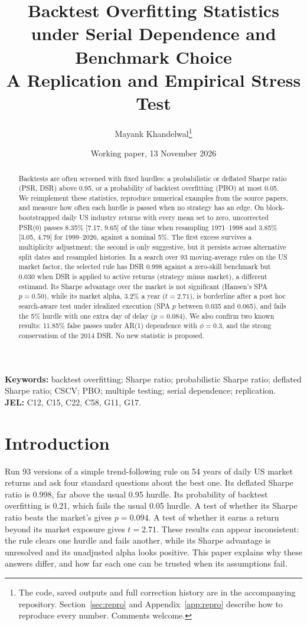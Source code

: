 \documentclass[11pt,a4paper]{article}
\title{\Large\textbf{Backtest Overfitting Statistics under Serial Dependence and Benchmark Choice}\\[4pt] \large A Replication and Empirical Stress Test}
\author{Mayank Khandelwal\thanks{The code, saved outputs and full correction history are in the accompanying repository. Section~\ref{sec:repro} and Appendix~\ref{app:repro} describe how to reproduce every number. Comments welcome.}}
\date{Working paper, 13 November 2026}
\begin{document}
\maketitle

\begin{abstract}
\noindent
Backtests are often screened with fixed hurdles: a probabilistic or deflated Sharpe ratio (PSR, DSR) above 0.95, or a probability of backtest overfitting (PBO) at most 0.05. We reimplement these statistics, reproduce numerical examples from the source papers, and measure how often each hurdle is passed when no strategy has an edge. On block-bootstrapped daily US industry returns with every mean set to zero, uncorrected PSR(0) passes 8.35\% [7.17, 9.65] of the time when resampling 1971--1998 and 3.85\% [3.05, 4.79] for 1999--2026, against a nominal 5\%. The first excess survives a multiplicity adjustment; the second is only suggestive, but it persists across alternative split dates and resampled histories. In a search over 93 moving-average rules on the US market factor, the selected rule has DSR 0.998 against a zero-skill benchmark but 0.030 when DSR is applied to active returns (strategy minus market), a different estimand. Its Sharpe advantage over the market is not significant (Hansen's SPA $p=0.50$), while its market alpha, 3.2\% a year ($t=2.71$), is borderline after a post hoc search-aware test under idealized execution (SPA $p$ between 0.035 and 0.065), and fails the 5\% hurdle with one extra day of delay ($p=0.084$). We also confirm two known results: 11.85\% false passes under AR(1) dependence with $\phi=0.3$, and the strong conservatism of the 2014 DSR. No new statistic is proposed.
\end{abstract}

\noindent\textbf{Keywords:} backtest overfitting; Sharpe ratio; probabilistic Sharpe ratio; deflated Sharpe ratio; CSCV; PBO; multiple testing; serial dependence; replication.\\
\noindent\textbf{JEL:} C12, C15, C22, C58, G11, G17.

\section{Introduction}\label{sec:intro}

Run 93 versions of a simple trend-following rule on 54 years of daily US market returns and ask four standard questions about the best one. Its deflated Sharpe ratio is 0.998, far above the usual 0.95 hurdle. Its probability of backtest overfitting is 0.21, which fails the usual 0.05 hurdle. A test of whether its Sharpe ratio beats the market's gives $p=0.094$. A test of whether it earns a return beyond its market exposure gives $t=2.71$. These results can appear inconsistent: the rule clears one hurdle and fails another, while its Sharpe advantage is unresolved and its unadjusted alpha looks positive. This paper explains why these answers differ, and how far each one can be trusted when its assumptions fail.
\end{document}
